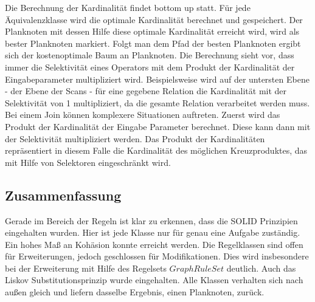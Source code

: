 Die Berechnung der Kardinalität findet bottom up statt. Für jede Äquivalenzklasse wird die optimale Kardinalität berechnet und gespeichert. Der Planknoten mit dessen Hilfe diese optimale Kardinalität erreicht wird, wird als bester Planknoten markiert. Folgt man dem Pfad der besten Planknoten ergibt sich der kostenoptimale Baum an Planknoten. Die Berechnung sieht vor, dass immer die Selektivität eines Operators mit dem Produkt der Kardinalität der Eingabeparameter multipliziert wird. Beispielsweise wird auf der untersten Ebene - der Ebene der Scans - für eine gegebene Relation die Kardinalität mit der Selektivität von 1 multipliziert, da die gesamte Relation verarbeitet werden muss. Bei einem Join können komplexere Situationen auftreten. Zuerst wird das Produkt der Kardinalität der Eingabe Parameter berechnet. Diese kann dann mit der 
Selektivität multipliziert werden. Das Produkt der Kardinalitäten repräsentiert in diesem Falle die Kardinalität des möglichen Kreuzproduktes, das mit Hilfe von Selektoren eingeschränkt wird.



\subsection{Zusammenfassung}

Gerade im Bereich der Regeln ist klar zu erkennen, dass die SOLID Prinzipien eingehalten wurden. Hier ist jede Klasse nur für genau eine Aufgabe zuständig. Ein hohes Maß an Kohäsion konnte erreicht werden. Die Regelklassen  sind offen für Erweiterungen, jedoch geschlossen für Modifikationen. Dies wird insbesondere bei der Erweiterung mit Hilfe des Regelsets $GraphRuleSet$ deutlich. Auch das Liskov Substitutionsprinzip wurde eingehalten. Alle Klassen verhalten sich nach außen gleich und liefern dasselbe Ergebnis, einen Planknoten, zurück. 